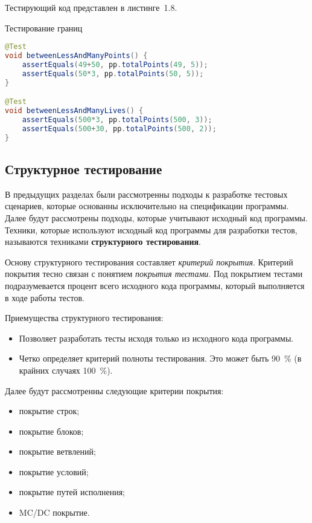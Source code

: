 Тестирующий код представлен в листинге~1.8.

\begin{ListingEnv}[!h]%
	\captiondelim{ } %
	\caption{Тестирование границ}
	\begin{lstlisting}[language={Java}]
@Test
void betweenLessAndManyPoints() {
	assertEquals(49+50, pp.totalPoints(49, 5));
	assertEquals(50*3, pp.totalPoints(50, 5));
}

@Test
void betweenLessAndManyLives() {
	assertEquals(500*3, pp.totalPoints(500, 3));
	assertEquals(500+30, pp.totalPoints(500, 2));
}
	\end{lstlisting}
\end{ListingEnv}%



\subsection{Структурное тестирование} 
 
В предыдущих разделах были рассмотренны подходы к разработке тестовых сценариев, которые основанны исключительно на спецификации программы. Далее будут рассмотрены подходы, которые учитывают исходный код программы. Техники, которые используют исходный код программы для разработки тестов, называются техниками \textbf{структурного тестирования}.

Основу структурного тестирования составляет \textit{критерий покрытия}. Критерий покрытия тесно связан с понятием \textit{покрытия тестами}. Под покрытием тестами подразумевается процент всего исходного кода программы, который выполняется в ходе работы тестов.

Приемущества структурного тестирования:

\begin{itemize}
	\item Позволяет разработать тесты исходя только из исходного кода программы. 
	\item Четко определяет критерий полноты тестирования. Это может быть 90~\% (в крайних случаях 100~\%).
\end{itemize}


Далее будут рассмотренны следующие критерии покрытия:

\begin{itemize}
	\item покрытие строк;
	\item покрытие блоков;
	\item покрытие ветвлений;
	\item покрытие условий;
	\item покрытие путей исполнения;
	\item MC/DC покрытие.
\end{itemize}


